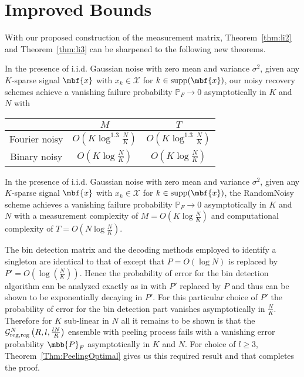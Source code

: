 \documentclass[conference]{IEEEtran}
\begin{document}
\section{Improved Bounds}
With our proposed construction of the measurement matrix, Theorem~\ref{thm:li2} and Theorem~\ref{thm:li3} can be sharpened to the following new theorems.
\begin{theorem}\label{Thm:ourSubLinearNoisy}  In the presence of i.i.d. Gaussian noise with zero mean and
variance $\sigma^2$, given any $K$-sparse signal $\mbf{x}$ with $x_k \in \mathcal{X}$ for $k \in \text{supp} (\mbf{x})$, our noisy recovery schemes achieve a vanishing failure probability $\mathbb{P}_F \rightarrow 0$ asymptotically in $K$ and $N$ with
\begin{center}
\begin{tabular}{|c|c|c|}
  \hline
   & $M$ &  $T$ \\
  \hline
  Fourier noisy & $O\left(K \log^{1.3} \frac{N}{K} \right)$ & $O\left(K \log^{1.3} \frac{N}{K} \right)$ \\
  \hline
  Binary noisy & $O\left(K \log \frac{N}{K} \right)$  & $O\left(K \log \frac{N}{K} \right)$ \\
  \hline
\end{tabular}
\end{center}
\end{theorem}

\begin{theorem} \label{Thm:ourNearLinearNoisy} In the presence of i.i.d. Gaussian noise with zero mean and
variance $\sigma^2$, given any $K$-sparse signal $\mbf{x}$ with $x_k \in \mathcal{X}$ for $k \in \text{supp} (\mbf{x})$, the RandomNoisy scheme achieves a vanishing failure probability $\mathbb{P}_F \rightarrow 0$ asymptotically in $K$ and $N$ with a measurement complexity of $M = O \left( K \log \frac{N}{K} \right)$ and computational complexity of $T = O \left( N \log \frac{N}{K} \right)$.
\end{theorem}

\begin{IEEEproof}
The bin detection matrix and the decoding methods employed to identify a singleton are identical to that of \cite{li2015subdraft} except that $P=O(\log N)$ is replaced by $P'=O\left(\log(\frac{N}{K})\right)$. Hence the probability of error for the bin detection algorithm can be analyzed exactly as in \cite{li2015subdraft} with $P'$ replaced by $P$ and thus can be shown to be exponentially decaying in $P'$. For this particular choice of $P'$ the probability of error for the bin detection part vanishes asymptotically in $\frac{N}{K}$. Therefore for $K$ sub-linear in $N$ all it remains to be shown is that the $\mathcal{G}^N_{\rm reg,reg}\left(R,l, \frac{lN}{R} \right)$ ensemble with peeling process fails with a vanishing error probability $\mbb{P}_F$ asymptotically in $K$ and $N$. For choice of $l\geq 3$,  Theorem~\ref{Thm:PeelingOptimal} gives us this required result and that completes the proof.
\end{IEEEproof}
\end{document}
